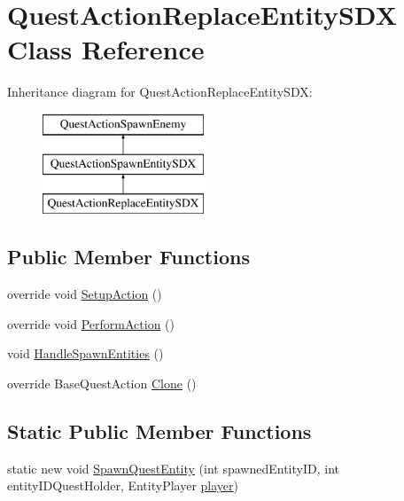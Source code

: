 \hypertarget{class_quest_action_replace_entity_s_d_x}{}\section{Quest\+Action\+Replace\+Entity\+S\+DX Class Reference}
\label{class_quest_action_replace_entity_s_d_x}
Inheritance diagram for Quest\+Action\+Replace\+Entity\+S\+DX\+:\begin{figure}[H]
\begin{center}
\leavevmode
\includegraphics[height=3.000000cm]{class_quest_action_replace_entity_s_d_x}
\end{center}
\end{figure}
\subsection*{Public Member Functions}
\begin{DoxyCompactItemize}
\item 
override void \mbox{\hyperlink{class_quest_action_replace_entity_s_d_x_a28155d29875c6d123001c03de564a6a6}{Setup\+Action}} ()
\item 
override void \mbox{\hyperlink{class_quest_action_replace_entity_s_d_x_a01f8dc126bd37662f40449931ce327ba}{Perform\+Action}} ()
\item 
void \mbox{\hyperlink{class_quest_action_replace_entity_s_d_x_ace14a3f3bb754bb3c6f92376820fb936}{Handle\+Spawn\+Entities}} ()
\item 
override Base\+Quest\+Action \mbox{\hyperlink{class_quest_action_replace_entity_s_d_x_a2305810e4e7b526f998f2f4a635bd974}{Clone}} ()
\end{DoxyCompactItemize}
\subsection*{Static Public Member Functions}
\begin{DoxyCompactItemize}
\item 
static new void \mbox{\hyperlink{class_quest_action_replace_entity_s_d_x_a8f4b438b4a683e051201e70381149959}{Spawn\+Quest\+Entity}} (int spawned\+Entity\+ID, int entity\+I\+D\+Quest\+Holder, Entity\+Player \mbox{\hyperlink{_sphere_i_i_01_music_01_boxes_2_config_2_localization_8txt_a4e2cb8aeff651600ea1cc57fe5a929a4}{player}})
\end{DoxyCompactItemize}


